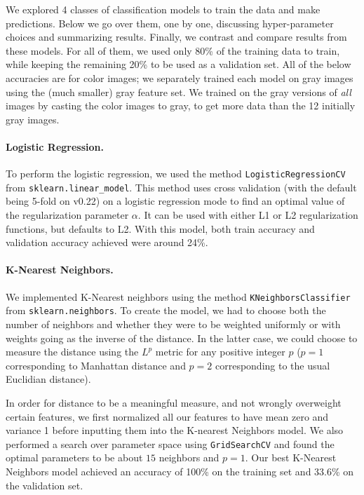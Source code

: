 \documentclass[aps,prl,twocolumn,superscriptaddress]{revtex4-1}
\renewcommand{\=}[1]{\stackrel{#1}{=}} %
\begin{document}
We explored 4 classes of classification models to train the data and make predictions. Below we go over them, one by one, discussing hyper-parameter choices and summarizing results. Finally, we contrast and compare results from these models. For all of them, we used only 80\% of the training data to train, while keeping the remaining 20\% to be used as a validation set. All of the below accuracies are for color images; we separately trained each model on gray images using the (much smaller) gray feature set. We trained on the gray versions of \textit{all} images by casting the color images to gray, to get more data than the 12 initially gray images.

\paragraph{Logistic Regression.} To perform the logistic regression, we used the method \texttt{LogisticRegressionCV} from  \texttt{sklearn.linear\_model}. This method uses cross validation (with the default being 5-fold on v0.22) on a logistic regression mode to find an optimal value of the regularization parameter $\alpha.$  It can be used with either L1 or L2 regularization functions, but defaults to L2. With this model, both train accuracy and validation accuracy achieved were around 24\%.

\paragraph{K-Nearest Neighbors.} We implemented K-Nearest neighbors using the method \texttt{KNeighborsClassifier} from \texttt{sklearn.neighbors}. To create the model, we had to choose both the number of neighbors and whether they were to be weighted uniformly or with weights going as the inverse of the  distance. In the latter case, we could choose to measure the distance using the $L^p$ metric for any positive integer $p$ ($p=1$ corresponding to Manhattan distance and $p=2$ corresponding to the usual Euclidian distance).

In order for distance to be a meaningful measure, and not wrongly overweight certain features, we first normalized all our features to have mean zero and variance 1 before inputting them into the K-nearest Neighbors model. We also performed a search over parameter space using \texttt{GridSearchCV} and found the optimal parameters to be about $15$ neighbors and $p=1.$ Our best K-Nearest Neighbors model achieved an accuracy of 100\% on the training set and 33.6\% on the validation set.
\end{document}
